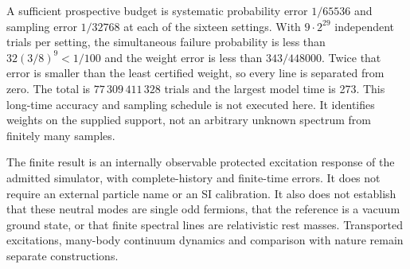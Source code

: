A sufficient prospective budget is systematic probability error
$1/65536$ and sampling error $1/32768$ at each of the sixteen settings.
With $9\cdot2^{29}$ independent trials per setting, the simultaneous
failure probability is less than $32(3/8)^9<1/100$ and the weight error is
less than $343/448000$.  Twice that error is smaller than the least
certified weight, so every line is separated from zero.  The total is
$77\,309\,411\,328$ trials and the largest model time is 273.
This long-time accuracy and sampling schedule is not executed here.
It identifies weights on the supplied support, not an arbitrary unknown
spectrum from finitely many samples.

The finite result is an internally observable protected excitation response
of the admitted simulator, with complete-history and finite-time errors.
It does not require an external particle name or an SI calibration.  It also
does not establish that these neutral modes are single odd fermions, that
the reference is a vacuum ground state, or that finite spectral lines are
relativistic rest masses.  Transported excitations, many-body continuum
dynamics and comparison with nature remain separate constructions.
